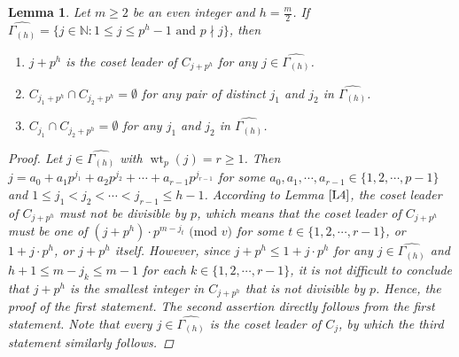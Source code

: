 \documentclass[pdflatex,sn-mathphys-num]{sn-jnl}%
\newtheorem{lemma}{Lemma}
\theoremstyle{thmstyleone}%
\theoremstyle{thmstyletwo}%
\theoremstyle{thmstylethree}%
\begin{document}
\begin{lemma}\label{L16}
    Let $m\geq 2$ be an even integer and $h=\frac{m}{2}$. If $\widehat{\Gamma_{(h)}}=\{j\in\mathbb{N}:1\leq j\leq p^{h}-1\text{ and }p\nmid j\}$, then
    \begin{enumerate}
        \item[$1.$] $j+p^{h}$ is the coset leader of $C_{j+p^{h}}$ for any $j\in\widehat{\Gamma_{(h)}}$.
        \item[$2.$] $C_{j_{1}+p^{h}}\cap C_{j_{2}+p^{h}}=\emptyset$ for any pair of distinct $j_{1}$ and $j_{2}$ in $\widehat{\Gamma_{(h)}}$.
        \item[$3.$] $C_{j_{1}}\cap C_{j_{2}+p^{h}}=\emptyset$ for any $j_{1}$ and $j_{2}$ in $\widehat{\Gamma_{(h)}}$.
    \end{enumerate}
    \begin{proof}
        Let $j\in\widehat{\Gamma_{(h)}}$ with $\operatorname{wt}_{p}(j)=r\geq 1$. Then $j=a_{0}+a_{1}p^{j_{1}}+a_{2}p^{j_{2}}+\cdots+a_{r-1}p^{j_{r-1}}$ for some $a_{0},a_{1},\cdots,a_{r-1}\in\{1,2,\cdots,p-1\}$ and $1\leq j_{1}<j_{2}<\cdots<j_{r-1}\leq h-1$. According to Lemma $\ref{L4}$, the coset leader of $C_{j+p^{h}}$ must not be divisible by $p$, which means that the coset leader of $C_{j+p^{h}}$ must be one of $(j+p^{h})\cdot p^{m-j_{t}}\text{ (mod $v$)}$ for some $t\in\{1,2,\cdots,r-1\}$, or $1+j\cdot p^{h}$, or $j+p^{h}$ itself. However, since $j+p^{h}\leq 1+j\cdot p^{h}$ for any $j\in\widehat{\Gamma_{(h)}}$ and $h+1\leq m-j_{k}\leq m-1$ for each $k\in\{1,2,\cdots,r-1\}$, it is not difficult to conclude that $j+p^{h}$ is the smallest integer in $C_{j+p^{h}}$ that is not divisible by $p$. Hence, the proof of the first statement. The second assertion directly follows from the first statement. Note that every $j\in\widehat{\Gamma_{(h)}}$ is the coset leader of $C_{j}$, by which the third statement similarly follows.
    \end{proof}
\end{lemma}
\end{document}
